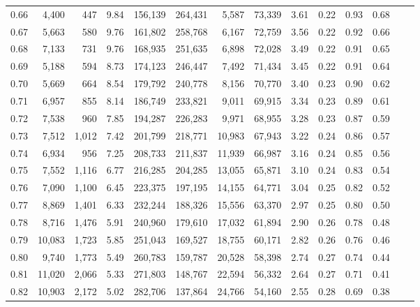 \begin{tabular}{rrrrrrrrrrrrrr}
0.66 &   4,400 &    447 &     9.84 &  156,139 &  264,431 &   5,587 &  73,339 &  3.61 &  0.22 &  0.93 &      0.68 \\
0.67 &   5,663 &    580 &     9.76 &  161,802 &  258,768 &   6,167 &  72,759 &  3.56 &  0.22 &  0.92 &      0.66 \\
0.68 &   7,133 &    731 &     9.76 &  168,935 &  251,635 &   6,898 &  72,028 &  3.49 &  0.22 &  0.91 &      0.65 \\
0.69 &   5,188 &    594 &     8.73 &  174,123 &  246,447 &   7,492 &  71,434 &  3.45 &  0.22 &  0.91 &      0.64 \\
0.70 &   5,669 &    664 &     8.54 &  179,792 &  240,778 &   8,156 &  70,770 &  3.40 &  0.23 &  0.90 &      0.62 \\
0.71 &   6,957 &    855 &     8.14 &  186,749 &  233,821 &   9,011 &  69,915 &  3.34 &  0.23 &  0.89 &      0.61 \\
0.72 &   7,538 &    960 &     7.85 &  194,287 &  226,283 &   9,971 &  68,955 &  3.28 &  0.23 &  0.87 &      0.59 \\
0.73 &   7,512 &  1,012 &     7.42 &  201,799 &  218,771 &  10,983 &  67,943 &  3.22 &  0.24 &  0.86 &      0.57 \\
0.74 &   6,934 &    956 &     7.25 &  208,733 &  211,837 &  11,939 &  66,987 &  3.16 &  0.24 &  0.85 &      0.56 \\
0.75 &   7,552 &  1,116 &     6.77 &  216,285 &  204,285 &  13,055 &  65,871 &  3.10 &  0.24 &  0.83 &      0.54 \\
0.76 &   7,090 &  1,100 &     6.45 &  223,375 &  197,195 &  14,155 &  64,771 &  3.04 &  0.25 &  0.82 &      0.52 \\
0.77 &   8,869 &  1,401 &     6.33 &  232,244 &  188,326 &  15,556 &  63,370 &  2.97 &  0.25 &  0.80 &      0.50 \\
0.78 &   8,716 &  1,476 &     5.91 &  240,960 &  179,610 &  17,032 &  61,894 &  2.90 &  0.26 &  0.78 &      0.48 \\
0.79 &  10,083 &  1,723 &     5.85 &  251,043 &  169,527 &  18,755 &  60,171 &  2.82 &  0.26 &  0.76 &      0.46 \\
0.80 &   9,740 &  1,773 &     5.49 &  260,783 &  159,787 &  20,528 &  58,398 &  2.74 &  0.27 &  0.74 &      0.44 \\
0.81 &  11,020 &  2,066 &     5.33 &  271,803 &  148,767 &  22,594 &  56,332 &  2.64 &  0.27 &  0.71 &      0.41 \\
0.82 &  10,903 &  2,172 &     5.02 &  282,706 &  137,864 &  24,766 &  54,160 &  2.55 &  0.28 &  0.69 &      0.38 \\

\end{tabular}
